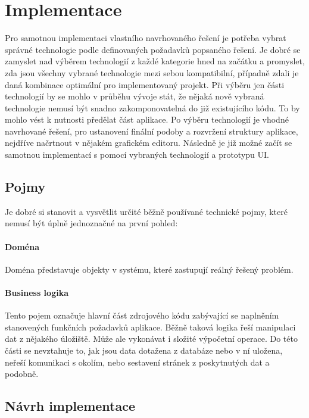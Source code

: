 \section{Implementace}

Pro samotnou implementaci vlastního navrhovaného řešení je potřeba vybrat správné technologie podle definovaných požadavků
popsaného řešení.
Je dobré se zamyslet nad výběrem technologií z každé kategorie hned na začátku a promyslet, zda jsou všechny vybrané technologie
mezi sebou kompatibilní, případně zdali je daná kombinace optimální pro implementovaný projekt.
Při výběru jen části technologií by se mohlo v průběhu vývoje stát, že nějaká nově vybraná technologie nemusí být snadno
zakomponovatelná do již existujícího kódu.
To by mohlo vést k nutnosti předělat část aplikace.
Po výběru technologií je vhodné navrhované řešení, pro ustanovení finální
podoby a rozvržení struktury aplikace, nejdříve načrtnout v nějakém grafickém editoru.
Následně je již možné začít se samotnou implementací s pomocí vybraných technologií a prototypu \ac{UI}.

	\subsection{Pojmy}

	Je dobré si stanovit a vysvětlit určité běžně používané technické pojmy, které
	nemusí být úplně jednoznačné na první pohled:

		\paragraph{Doména}

		Doména představuje objekty v systému, které zastupují reálný řešený problém.

		\paragraph{Business logika}

		Tento pojem označuje hlavní část zdrojového kódu zabývající se naplněním stanovených funkčních požadavků aplikace.
		Běžně taková logika řeší manipulaci dat z nějakého úložiště.
		Může ale vykonávat i složité výpočetní operace.
		Do této části se nevztahuje to, jak jsou data dotažena z databáze nebo v ní uložena, neřeší komunikaci
		s okolím, nebo sestavení stránek z poskytnutých
		dat a podobně.

	\subsection{Návrh implementace}

